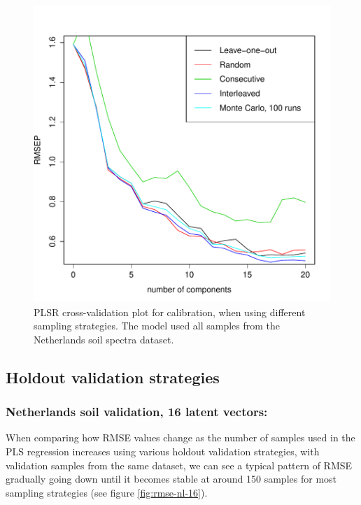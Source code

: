 \documentclass{isprs}
\begin{document}
\begin{figure}[ht!]
\includegraphics[width=1.0\columnwidth]{../script/output/cv.pdf}
\begin{center}
    \caption{PLSR cross-validation plot for calibration, when using different sampling strategies. The model used all samples from the Netherlands soil spectra dataset.}
    \label{fig:cv}
\end{center}
\end{figure}

\subsection{Holdout validation strategies}\label{sec:Holdout validation strategies 2}

\subsubsection{Netherlands soil validation, 16 latent vectors:}\label{sec:NL16}

When comparing how RMSE values change as the number of samples used in the PLS regression increases using various holdout validation strategies, with validation samples from the same dataset, we can see a typical pattern of RMSE gradually going down until it becomes stable at around 150 samples for most sampling strategies (see figure \ref{fig:rmse-nl-16}).
\end{document}
